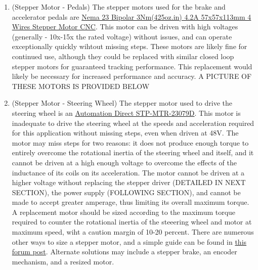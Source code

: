 \documentclass{article}
\begin{document}
\begin{enumerate}
\item(Stepper Motor - Pedals) The stepper motors used for the brake and accelerator pedals are \href{https://www.omc-stepperonline.com/nema-23-bipolar-3nm-425oz-in-4-2a-57x57x114mm-4-wires-stepper-motor-cnc-23hs45-4204s}{Nema 23 Bipolar 3Nm(425oz.in) 4.2A 57x57x113mm 4 Wires Stepper Motor CNC}. This motor can be driven with high voltages (generally - 10x-15x the rated voltage) without issues, and can operate exceptionally quickly wihtout missing steps. These motors are likely fine for continued use, although they could be replaced with similar closed loop stepper motors for guaranteed tracking performance. This replacement would likely be necessary for increased performance and accuracy.
A PICTURE OF THESE MOTORS IS PROVIDED BELOW

\item(Stepper Motor - Steering Wheel) The stepper motor used to drive the steering wheel is an \href{https://www.automationdirect.com/adc/shopping/catalog/motion_control/stepper_systems/dual_shaft_and_encoder_stepper_motors/stp-mtr-23079d}{Automation Direct STP-MTR-23079D}. This motor is inadequate to drive the steering wheel at the speeds and acceleration required for this application without missing steps, even when driven at 48V. The motor may miss steps for two reasons: it does not produce enough torque to entirely overcome the rotational inertia of the steering wheel and itself, and it cannot be driven at a high enough voltage to overcome the effects of the inductance of its coils on its acceleration. The motor cannot be driven at a higher voltage without replacing the stepper driver (DETAILED IN NEXT SECTION), the power supply (FOLLOWING SECTION), and cannot be made to accept greater amperage, thus limiting its overall maximum torque. A replacement motor should be sized according to the maximum torque required to counter the rotational inertia of the steeering wheel and motor at maximum speed, wiht a caution margin of 10-20 percent. There are numerous other ways to size a stepper motor, and a simple guide can be found in \href{https://forum.arduino.cc/t/stepper-motor-basics/275223}{this forum post}. Alternate solutions may include a stepper brake, an encoder mechanism, and a resized motor.


\end{enumerate}
\end{document}
